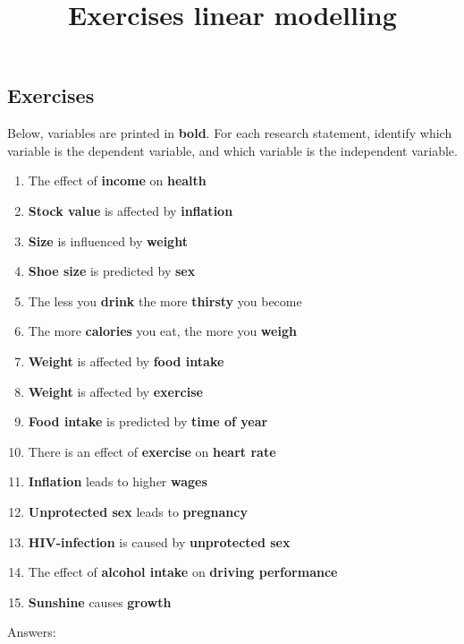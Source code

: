 \documentclass{article}\usepackage[]{graphicx}\usepackage[]{color}
\title{Exercises linear modelling}
\begin{document}
\subsection{Exercises}

Below, variables are printed in \textbf{bold}. For each research statement, identify which variable is the dependent variable, and which variable is the independent variable.

\begin{enumerate}

\item The effect of \textbf{income} on \textbf{health}
\item \textbf{Stock value} is affected by \textbf{inflation}
\item \textbf{Size} is influenced by \textbf{weight}
\item \textbf{Shoe size} is predicted by \textbf{sex}
\item The less you \textbf{drink} the more \textbf{thirsty} you become
\item The more \textbf{calories} you eat, the more you \textbf{weigh}
\item \textbf{Weight} is affected by \textbf{food intake}
\item \textbf{Weight} is affected by \textbf{exercise}
\item \textbf{Food intake} is predicted by \textbf{time of year}
\item There is an effect of \textbf{exercise} on \textbf{heart rate}
\item \textbf{Inflation} leads to higher \textbf{wages}
\item \textbf{Unprotected sex} leads to \textbf{pregnancy}
\item \textbf{HIV-infection} is caused by \textbf{unprotected sex}
\item The effect of \textbf{alcohol intake} on \textbf{driving performance}
\item \textbf{Sunshine} causes \textbf{growth}


\end{enumerate}

Answers:
\end{document}
